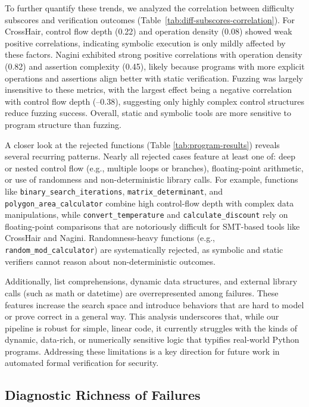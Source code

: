 \documentclass[8pt]{extarticle}
\begin{document}
To further quantify these trends, we analyzed the correlation between difficulty subscores and verification outcomes (Table~\ref{tab:diff-subscores-correlation}). For CrossHair, control flow depth (0.22) and operation density (0.08) showed weak positive correlations, indicating symbolic execution is only mildly affected by these factors. Nagini exhibited strong positive correlations with operation density (0.82) and assertion complexity (0.45), likely because programs with more explicit operations and assertions align better with static verification. Fuzzing was largely insensitive to these metrics, with the largest effect being a negative correlation with control flow depth (--0.38), suggesting only highly complex control structures reduce fuzzing success. Overall, static and symbolic tools are more sensitive to program structure than fuzzing.

A closer look at the rejected functions (Table \ref{tab:program-results}) reveals several recurring patterns. Nearly all rejected cases feature at least one of: deep or nested control flow (e.g., multiple loops or branches), floating-point arithmetic, or use of randomness and non-deterministic library calls. For example, functions like \texttt{binary\_search\_iterations}, \texttt{matrix\_determinant}, and \texttt{polygon\_area\_calculator} combine high control-flow depth with complex data manipulations, while \texttt{convert\_temperature} and \texttt{calculate\_discount} rely on floating-point comparisons that are notoriously difficult for SMT-based tools like CrossHair and Nagini. Randomness-heavy functions (e.g., \texttt{random\_mod\_calculator}) are systematically rejected, as symbolic and static verifiers cannot reason about non-deterministic outcomes. 

Additionally, list comprehensions, dynamic data structures, and external library calls (such as math or datetime) are overrepresented among failures. These features increase the search space and introduce behaviors that are hard to model or prove correct in a general way. This analysis underscores that, while our pipeline is robust for simple, linear code, it currently struggles with the kinds of dynamic, data-rich, or numerically sensitive logic that typifies real-world Python programs. Addressing these limitations is a key direction for future work in automated formal verification for security.

\subsection{Diagnostic Richness of Failures}
\end{document}
